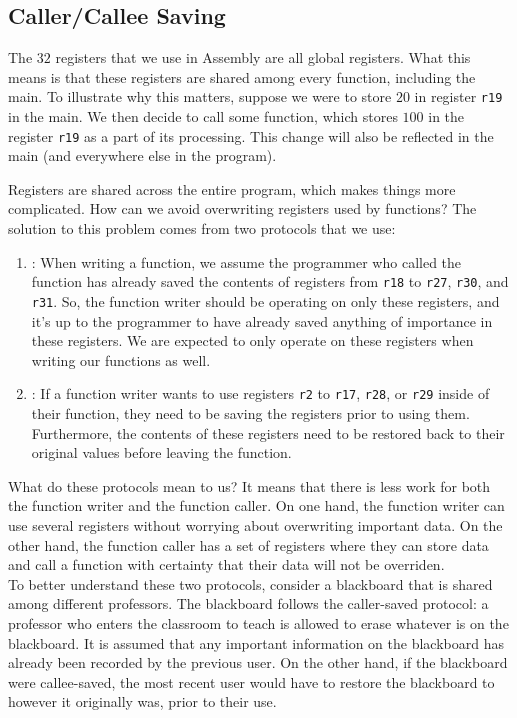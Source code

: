 \subsection{Caller/Callee Saving}

The $32$ registers that we use in Assembly are all global registers. What this means is that these registers are shared among every function, including the main. To illustrate why this matters, suppose we were to store $20$ in register \verb!r19! in the main. We then decide to call some function, which stores $100$ in the register \verb!r19! as a part of its processing. This change will also be reflected in the main (and everywhere else in the program). 

Registers are shared across the entire program, which makes things more complicated. How can we avoid overwriting registers used by functions? The solution to this problem comes from two protocols that we use: \begin{enumerate}
    \item {}: When writing a function, we assume the programmer who called the function has already saved the contents of registers from \verb!r18! to \verb!r27!, \verb!r30!, and \verb!r31!. So, the function writer should be operating on only these registers, and it's up to the programmer to have already saved anything of importance in these registers. We are expected to only operate on these registers when writing our functions as well.
    \item {}: If a function writer wants to use registers \verb!r2! to \verb!r17!, \verb!r28!, or \verb!r29! inside of their function, they need to be saving the registers prior to using them. Furthermore, the contents of these registers need to be restored back to their original values before leaving the function.
\end{enumerate}

What do these protocols mean to us? It means that there is less work for both the function writer and the function caller. On one hand, the function writer can use several registers without worrying about overwriting important data. On the other hand, the function caller has a set of registers where they can store data and call a function with certainty that their data will not be overriden. \\

To better understand these two protocols, consider a blackboard that is shared among different professors. The blackboard follows the caller-saved protocol: a professor who enters the classroom to teach is allowed to erase whatever is on the blackboard. It is assumed that any important information on the blackboard has already been recorded by the previous user. On the other hand, if the blackboard were callee-saved, the most recent user would have to restore the blackboard to however it originally was, prior to their use.  


